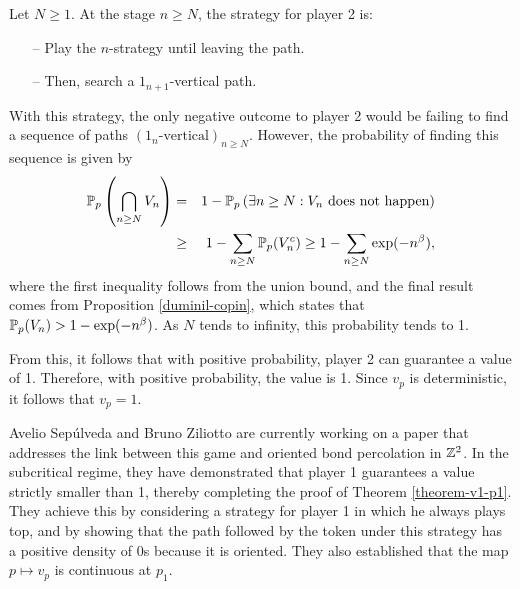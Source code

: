         Let $N \geq 1$. At the stage $n \geq N$, the strategy for player 2 is: 
        \begin{itemize}
            \item[--] Play the $n$-strategy until leaving the path.
            \item[--] Then, search a $1_{n + 1}$-vertical path.
        \end{itemize}

        With this strategy, the only negative outcome to player 2 would be failing to find a sequence of paths $(1_n\text{-vertical})_{n \geq N}$. However, the probability of finding this sequence is given by
        \begin{eqnarray} \notag
            \mathbb{P}_p\left(\bigcap_{n \geq N}V_n\right) & = & 1 - \mathbb{P}_p\left(\exists n \geq N : V_n \text{ does not happen}\right) \\ \notag
            & \geq & 1 - \sum_{n \geq N} \mathbb{P}_p(V_n^c)  \geq 1 - \sum_{n \geq N} \exp(-n^{\beta}), 
        \end{eqnarray}
        where the first inequality follows from the union bound, and the final result comes from Proposition \ref{duminil-copin}, which states that $\mathbb{P}_p(V_n) > 1 - \exp(-n^{\beta})$. As $N$ tends to infinity, this probability tends to 1. 

        From this, it follows that with positive probability, player 2 can guarantee a value of 1. Therefore, with positive probability, the value is 1. Since $v_p$ is deterministic, it follows that $v_p =  1$. 

        Avelio Sepúlveda and Bruno Ziliotto are currently working on a paper that addresses the link between this game and oriented bond percolation in $\mathbb{Z}^2$. In the subcritical regime, they have demonstrated that player 1 guarantees a value strictly smaller than 1, thereby completing the proof of Theorem \ref{theorem-v1-p1}. They achieve this by considering a strategy for player 1 in which he always plays top, and by showing that the path followed by the token under this strategy has a positive density of 0s because it is oriented. They also established that the map $p \mapsto v_p$ is continuous at $p_1$. 

